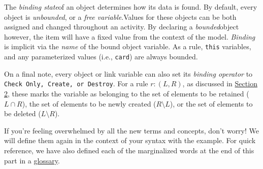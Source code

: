 The \emph{binding state}of an object determines how its data is found. By default, every object is \emph{unbounded}, or a  \emph{free
variable}.Values for these objects can be both assigned and changed throughout an activity. By declaring a
\emph{bounded}object however, the item will have a fixed value from the context of the model.
\emph{Binding} is implicit via the \emph{name} of the bound object variable. As a rule, \texttt{this} variables, and any parameterized values (i.e.,
\texttt{card}) are always bounded.

On a final note, every object or link variable can also set its \emph{binding operator} to \texttt{Check Only, Create, or Destroy}. For a rule $r: (L,
R)$, as discussed in \hyperlink{explanation}{Section 2}, these marks the variable as belonging to the set of elements to be retained ($L\cap R$), the set of
elements to be newly created ($R\setminus L$), or the set of elements to be deleted ($L\setminus R$).

If you're feeling overwhelmed by all the new terms and concepts, don't worry! We will define them again in the context of your syntax with the example. For
quick reference, we have also defined each of the marginalized words at the end of this part in a \hyperlink{glossary}{glossary}. 








